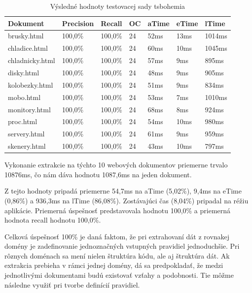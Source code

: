 \begin{table}[hbt]
\caption{Výsledné hodnoty testovacej sady tsbohemia}
\centering
\begin{tabular}{|l|l|l|l|l|l|l|}
\hline
\textbf{Dokument}          & \textbf{Precision} & \textbf{Recall}  & \textbf{OC}  & \textbf{aTime} & \textbf{eTime} & \textbf{lTime}  \\ \hline
brusky.html     & 100,0\%   & 100,0\% & 24 & 52ms  & 13ms  & 1014ms \\ \hline
chladice.html   & 100,0\%   & 100,0\% & 24 & 60ms  & 10ms  & 1045ms \\ \hline
chladnicky.html & 100,0\%   & 100,0\% & 24 & 57ms  & 9ms   & 895ms  \\ \hline
disky.html      & 100,0\%   & 100,0\% & 24 & 48ms  & 9ms   & 905ms  \\ \hline
kolobezky.html  & 100,0\%   & 100,0\% & 24 & 51ms  & 9ms   & 834ms  \\ \hline
mobo.html       & 100,0\%   & 100,0\% & 24 & 53ms  & 7ms   & 1010ms \\ \hline
monitory.html   & 100,0\%   & 100,0\% & 24 & 68ms  & 8ms   & 924ms  \\ \hline
proc.html       & 100,0\%   & 100,0\% & 24 & 54ms  & 10ms  & 980ms  \\ \hline
servery.html    & 100,0\%   & 100,0\% & 24 & 61ms  & 9ms   & 959ms  \\ \hline
skenery.html    & 100,0\%   & 100,0\% & 24 & 43ms  & 10ms  & 797ms  \\ \hline
\end{tabular}
\end{table}

Vykonanie extrakcie na týchto 10 webových dokumentov priemerne trvalo 10876ms, čo nám dáva hodnotu 1087,6ms na jeden dokument. 

Z tejto hodnoty pripadá priemerne 54,7ms na aTime (5,02\%), 9,4ms na eTime (0,86\%) a 936,3ms na lTime (86,08\%). Zostávajúci čas (8,04\%) pripadal na réžiu aplikácie. Priemerná úspešnosť predstavovala hodnotu 100,0\% a priemerná hodnota recall hodnotu 100,0\%. 

\bigskip

Celková úspešnosť 100\% je daná faktom, že pri extrahovaní dát z rovnakej domény je zadefinovanie jednoznačných vstupných pravidiel jednoduchšie. Pri rôznych doménach sa mení nielen štruktúra kódu, ale aj štruktúra dát. Ak extrakcia prebieha v rámci jednej domény, dá sa predpokladať, že medzi jednotlivými dokumentami budú existovať vzťahy a podobnosti. Tie môžme následne využiť pri tvorbe definícií pravidiel.

